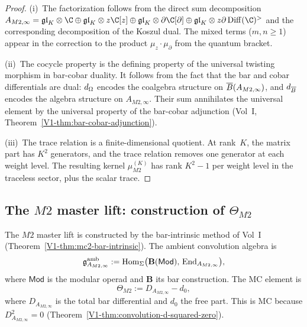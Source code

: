\begin{proof}
(i)~The factorization follows from the direct sum decomposition
$A_{M2,\infty}
= \mathfrak{gl}_K\otimes\C\oplus\mathfrak{gl}_K\otimes z\C[z]
\oplus\mathfrak{gl}_K\otimes\partial\C[\partial]
\oplus\mathfrak{gl}_K\otimes z\partial\Diff(\C)^{>}$
and the corresponding decomposition of the Koszul dual. The
mixed terms ($m,n\ge 1$) appear in the correction to the
product $\mu_z\cdot\mu_\partial$ from the quantum bracket.

(ii)~The cocycle property is the defining property of the
universal twisting morphism in bar-cobar duality. It follows
from the fact that the bar and cobar differentials are dual:
$d_{\operatorname{\Omega}}$ encodes the coalgebra structure on $\overline{B}(A_{M2,\infty})$,
and $d_{\overline{B}}$ encodes the algebra structure on $A_{M2,\infty}$.
Their sum annihilates the universal element by the universal
property of the bar-cobar adjunction
(Vol~I, Theorem~\ref*{V1-thm:bar-cobar-adjunction}).

(iii)~The trace relation is a finite-dimensional quotient.
At rank~$K$, the matrix part has $K^2$ generators, and the
trace relation removes one generator at each weight level.
The resulting kernel $\mu_{M2}^{(K)}$ has rank $K^2-1$ per
weight level in the traceless sector, plus the scalar trace.
\end{proof}


\subsection{The \texorpdfstring{$M2$}{M2} master lift: construction of \texorpdfstring{$\Theta_{M2}$}{Theta\_\{M2\}}}

\begin{construction}
The $M2$ master lift is constructed by the bar-intrinsic method
of Vol~I (Theorem~\ref*{V1-thm:mc2-bar-intrinsic}). The ambient
convolution algebra is
\[
\mathfrak{g}^{\mathrm{amb}}_{A_{M2,\infty}}
:=
\operatorname{Hom}_{\Sigma}\bigl(
\mathbf{B}(\mathsf{Mod}),\,
\operatorname{End}_{A_{M2,\infty}}
\bigr),
\]
where $\mathsf{Mod}$ is the modular operad and $\mathbf{B}$
its bar construction. The MC element is
\begin{equation}%
\Theta_{M2}
:= D_{A_{M2,\infty}} - d_0,
\end{equation}
where $D_{A_{M2,\infty}}$ is the total bar differential and
$d_0$ the free part. This is MC because
$D_{A_{M2,\infty}}^2 = 0$
(Theorem~\ref*{V1-thm:convolution-d-squared-zero}).
\end{construction}

